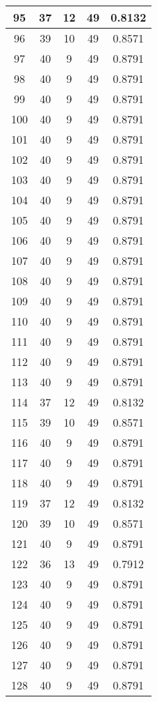 \documentclass[letterpaper, 12pt]{article}
\begin{document}
\begin{longtable}{|c|c|c|c|c|}
\hline
95 & 37 & 12 & 49 & 0.8132 \\
\hline
96 & 39 & 10 & 49 & 0.8571 \\
\hline
97 & 40 & 9 & 49 & 0.8791 \\
\hline
98 & 40 & 9 & 49 & 0.8791 \\
\hline
99 & 40 & 9 & 49 & 0.8791 \\
\hline
100 & 40 & 9 & 49 & 0.8791 \\
\hline
101 & 40 & 9 & 49 & 0.8791 \\
\hline
102 & 40 & 9 & 49 & 0.8791 \\
\hline
103 & 40 & 9 & 49 & 0.8791 \\
\hline
104 & 40 & 9 & 49 & 0.8791 \\
\hline
105 & 40 & 9 & 49 & 0.8791 \\
\hline
106 & 40 & 9 & 49 & 0.8791 \\
\hline
107 & 40 & 9 & 49 & 0.8791 \\
\hline
108 & 40 & 9 & 49 & 0.8791 \\
\hline
109 & 40 & 9 & 49 & 0.8791 \\
\hline
110 & 40 & 9 & 49 & 0.8791 \\
\hline
111 & 40 & 9 & 49 & 0.8791 \\
\hline
112 & 40 & 9 & 49 & 0.8791 \\
\hline
113 & 40 & 9 & 49 & 0.8791 \\
\hline
114 & 37 & 12 & 49 & 0.8132 \\
\hline
115 & 39 & 10 & 49 & 0.8571 \\
\hline
116 & 40 & 9 & 49 & 0.8791 \\
\hline
117 & 40 & 9 & 49 & 0.8791 \\
\hline
118 & 40 & 9 & 49 & 0.8791 \\
\hline
119 & 37 & 12 & 49 & 0.8132 \\
\hline
120 & 39 & 10 & 49 & 0.8571 \\
\hline
121 & 40 & 9 & 49 & 0.8791 \\
\hline
122 & 36 & 13 & 49 & 0.7912 \\
\hline
123 & 40 & 9 & 49 & 0.8791 \\
\hline
124 & 40 & 9 & 49 & 0.8791 \\
\hline
125 & 40 & 9 & 49 & 0.8791 \\
\hline
126 & 40 & 9 & 49 & 0.8791 \\
\hline
127 & 40 & 9 & 49 & 0.8791 \\
\hline
128 & 40 & 9 & 49 & 0.8791 \\

\end{longtable}
\end{document}
